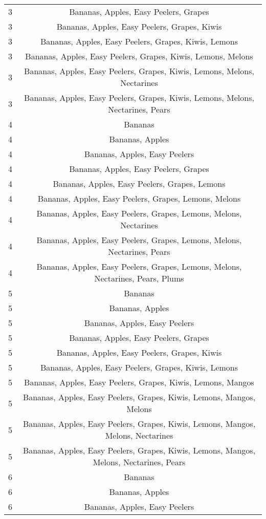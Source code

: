 \documentclass[11pt]{article}
\begin{document}
\begin{table}[h]
\begin{center}
\begin{tabular}{lc}
3 & Bananas, Apples, Easy Peelers, Grapes \\
3 & Bananas, Apples, Easy Peelers, Grapes, Kiwis \\
3 & Bananas, Apples, Easy Peelers, Grapes, Kiwis, Lemons \\
3 & Bananas, Apples, Easy Peelers, Grapes, Kiwis, Lemons, Melons \\
3 & Bananas, Apples, Easy Peelers, Grapes, Kiwis, Lemons, Melons, Nectarines \\
3 & Bananas, Apples, Easy Peelers, Grapes, Kiwis, Lemons, Melons, Nectarines, Pears \\
4 & Bananas \\
4 & Bananas, Apples \\
4 & Bananas, Apples, Easy Peelers \\
4 & Bananas, Apples, Easy Peelers, Grapes \\
4 & Bananas, Apples, Easy Peelers, Grapes, Lemons \\
4 & Bananas, Apples, Easy Peelers, Grapes, Lemons, Melons \\
4 & Bananas, Apples, Easy Peelers, Grapes, Lemons, Melons, Nectarines \\
4 & Bananas, Apples, Easy Peelers, Grapes, Lemons, Melons, Nectarines, Pears \\
4 & Bananas, Apples, Easy Peelers, Grapes, Lemons, Melons, Nectarines, Pears, Plums \\
5 & Bananas \\
5 & Bananas, Apples \\
5 & Bananas, Apples, Easy Peelers \\
5 & Bananas, Apples, Easy Peelers, Grapes \\
5 & Bananas, Apples, Easy Peelers, Grapes, Kiwis \\
5 & Bananas, Apples, Easy Peelers, Grapes, Kiwis, Lemons \\
5 & Bananas, Apples, Easy Peelers, Grapes, Kiwis, Lemons, Mangos \\
5 & Bananas, Apples, Easy Peelers, Grapes, Kiwis, Lemons, Mangos, Melons \\
5 & Bananas, Apples, Easy Peelers, Grapes, Kiwis, Lemons, Mangos, Melons, Nectarines \\
5 & Bananas, Apples, Easy Peelers, Grapes, Kiwis, Lemons, Mangos, Melons, Nectarines, Pears \\
6 & Bananas \\
6 & Bananas, Apples \\
6 & Bananas, Apples, Easy Peelers \\

\end{tabular}
\end{center}
\end{table}
\end{document}
